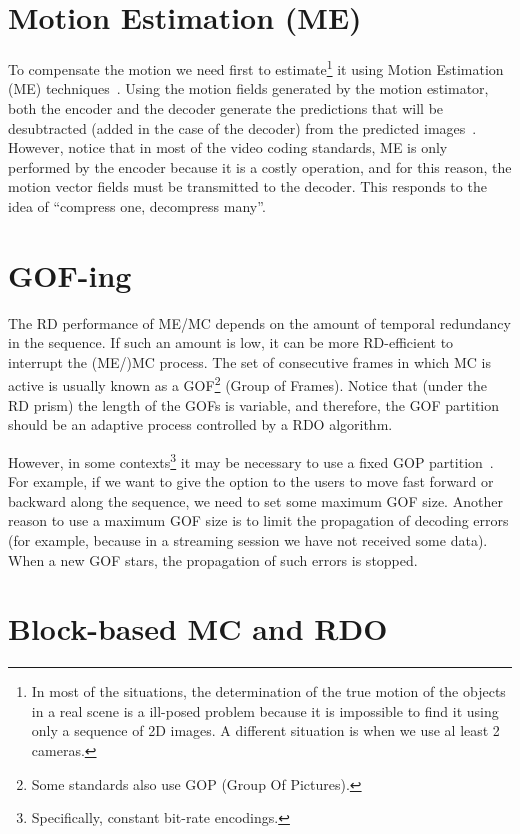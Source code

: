 
\section{Motion Estimation (ME)}

To compensate the motion we need first to estimate\footnote{In most of
  the situations, the determination of the true motion of the objects
  in a real scene is a ill-posed problem because it is impossible to
  find it using only a sequence of 2D images. A different situation is
  when we use al least 2 cameras.} it using Motion Estimation (ME)
techniques~\cite{vruiz__ME}. Using the motion fields generated by the
motion estimator, both the encoder and the decoder generate the
predictions that will be desubtracted (added in the case of the
decoder) from the predicted images~\cite{vruiz__MC}. However, notice
that in most of the video coding standards, ME is only performed by
the encoder because it is a costly operation, and for this reason, the
motion vector fields must be transmitted to the decoder. This responds
to the idea of ``compress one, decompress many''.


\section{GOF-ing}

The RD performance of ME/MC depends on the amount of temporal
redundancy in the sequence. If such an amount is low, it can be more
RD-efficient to interrupt the (ME/)MC process. The set of consecutive
frames in which MC is active is usually known as a GOF\footnote{Some
  standards also use GOP (Group Of Pictures).} (Group of
Frames). Notice that (under the RD prism) the length of the GOFs is
variable, and therefore, the GOF partition should be an adaptive
process controlled by a RDO algorithm.

However, in some contexts\footnote{Specifically, constant bit-rate
  encodings.} it may be necessary to use a fixed GOP
partition~\cite{vruiz__MC}. For example, if we want to give the option
to the users to move fast forward or backward along the sequence, we
need to set some maximum GOF size. Another reason to use a maximum GOF
size is to limit the propagation of decoding errors (for example,
because in a streaming session we have not received some data). When a
new GOF stars, the propagation of such errors is stopped.

\section{Block-based MC and RDO}

